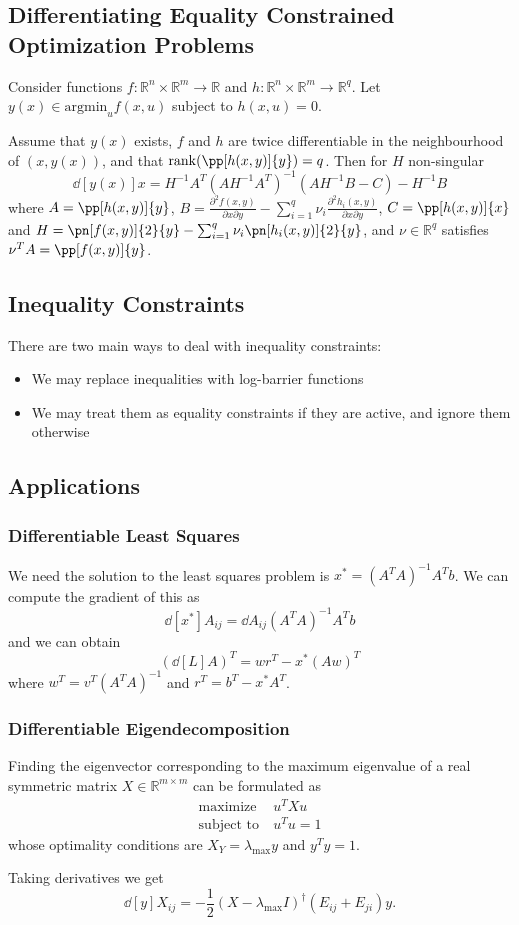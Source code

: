 \documentclass[11pt]{article}
\begin{document}
\subsection{Differentiating Equality Constrained Optimization Problems}
Consider functions $f: \mathbb{R}^n \times \mathbb{R}^m \rightarrow \mathbb{R}$ and $h: \mathbb{R}^n \times \mathbb{R}^m \rightarrow \mathbb{R}^q$. Let $y(x) \in \mathrm{argmin}_u f(x, u)$ subject to $h(x, u) = 0$. \par
Assume that $y(x)$ exists, $f$ and $h$ are twice differentiable in the neighbourhood of $(x, y(x))$, and that $\mathrm{rank}(\pp[h(x, y)]{y}) = q$. Then for $H$ non-singular 
\[ \dd[y(x)]{x} = H^{-1}A^T (AH^{-1}A^T)^{-1} (AH^{-1}B-C) - H^{-1}B \] 
where $A = \pp[h(x, y)]{y}$, $B = \frac{\partial^2 f(x, y)}{\partial x\partial y} - \sum_{i=1}^q \nu_i \frac{\partial^2 h_i(x, y)}{\partial x\partial y}$, $C = \pp[h(x, y)]{x}$ and $H = \pn[f(x, y)]{2}{y} - \sum_{i=1}^q \nu_i \pn[h_i(x, y)]{2}{y}$, and $\nu \in \mathbb{R}^q$ satisfies $\nu^TA = \pp[f(x, y)]{y}$.

\subsection{Inequality Constraints} 
There are two main ways to deal with inequality constraints:
\begin{itemize}
    \item We may replace inequalities with log-barrier functions
    \item We may treat them as equality constraints if they are active, and ignore them otherwise 
\end{itemize}

\subsection{Applications} 
\subsubsection{Differentiable Least Squares} 
We need the solution to the least squares problem is $x^* = (A^TA)^{-1}A^Tb$. We can compute the gradient of this as 
\[ \dd[x^*]{A_{ij}} = \dd{A_{ij}} (A^TA)^{-1}A^Tb \] 
and we can obtain 
\[ \left( \dd[L]{A} \right)^T = wr^T - x^*(Aw)^T \] 
where $w^T = v^T(A^TA)^{-1}$ and $r^T = b^T - x^*A^T$. \par

\subsubsection{Differentiable Eigendecomposition}
Finding the eigenvector corresponding to the maximum eigenvalue of a real symmetric matrix $X \in \mathbb{R}^{m \times m}$ can be formulated as 
\begin{align*}
    \text{maximize}~&u^TXu \\
    \text{subject to}~&u^Tu = 1
\end{align*} 
whose optimality conditions are $X_Y = \lambda_{\mathrm{max}}y$ and $y^Ty = 1$. \par
Taking derivatives we get 
\[ \dd[y]{X_{ij}} = -\frac{1}{2} (X - \lambda_{\mathrm{max}}I)^\dag (E_{ij} + E_{ji})y. \] 
\end{document}

